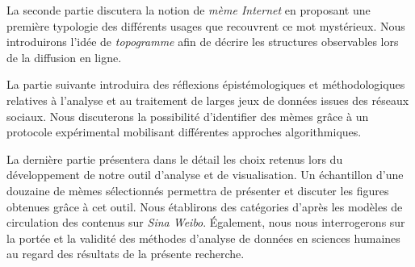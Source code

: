 La seconde partie discutera la notion de \textit{mème Internet} en proposant une première typologie des différents usages que recouvrent ce mot mystérieux. Nous introduirons l'idée de \textit{topogramme} afin de décrire les structures observables lors de la diffusion en ligne.

La partie suivante introduira des réflexions épistémologiques et méthodologiques relatives à l'analyse et au traitement de larges jeux de données issues des réseaux sociaux. Nous discuterons la possibilité d'identifier des mèmes grâce à un protocole expérimental mobilisant différentes approches algorithmiques.

La dernière partie présentera dans le détail les choix retenus lors du développement de notre outil d'analyse et de visualisation. Un échantillon d'une douzaine de mèmes sélectionnés permettra de présenter et discuter les figures obtenues grâce à cet outil. Nous établirons des catégories d'après les modèles de circulation des contenus sur \textit{Sina Weibo}. \'Egalement, nous nous interrogerons sur la portée et la validité des méthodes d'analyse de données en sciences humaines au regard des résultats de la présente recherche.





